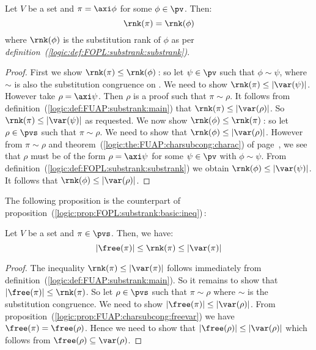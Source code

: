 \begin{prop}\label{logic:prop:FUAP:substrank:recursion:axiom}
Let $V$ be a set and $\pi=\axi\phi$ for some $\phi\in\pv$. Then:
    \[
    \rnk(\pi)=\rnk(\phi)
    \]
where $\rnk(\phi)$ is the substitution rank of $\phi$ as per {\em
definition~(\ref{logic:def:FOPL:substrank:substrank})}.
\end{prop}
\begin{proof}
First we show $\rnk(\pi)\leq\rnk(\phi)$\,: so let $\psi\in\pv$ such
that $\phi\sim\psi$, where $\sim$ is also the substitution
congruence on \pv. We need to show $\rnk(\pi)\leq|\var(\psi)|$.
However take $\rho=\axi\psi$. Then $\rho$ is a proof such that
$\pi\sim\rho$. It follows from
definition~(\ref{logic:def:FUAP:substrank:main}) that
$\rnk(\pi)\leq|\var(\rho)|$. So $\rnk(\pi)\leq|\var(\psi)|$ as
requested. We now show $\rnk(\phi)\leq\rnk(\pi)$\,: so let
$\rho\in\pvs$ such that $\pi\sim\rho$. We need to show that
$\rnk(\phi)\leq|\var(\rho)|$. However from $\pi\sim\rho$ and
theorem~(\ref{logic:the:FUAP:charsubcong:charac}) of
page~\pageref{logic:the:FUAP:charsubcong:charac}, we see that $\rho$
must be of the form $\rho=\axi\psi$ for some $\psi\in\pv$ with
$\phi\sim\psi$. From
definition~(\ref{logic:def:FOPL:substrank:substrank}) we obtain
$\rnk(\phi)\leq|\var(\psi)|$. It follows that
$\rnk(\phi)\leq|\var(\rho)|$.
\end{proof}

The following proposition is the counterpart of
proposition~(\ref{logic:prop:FOPL:substrank:basic:ineq})\,:

\begin{prop}\label{logic:prop:FUAP:substrank:basic:ineq}
Let $V$ be a set and $\pi\in\pvs$. Then, we have:
    \[
    |\free(\pi)|\leq\rnk(\pi)\leq|\var(\pi)|
    \]
\end{prop}
\begin{proof}
The inequality $\rnk(\pi)\leq|\var(\pi)|$ follows immediately from
definition~(\ref{logic:def:FUAP:substrank:main}). So it remains to
show that $|\free(\pi)|\leq\rnk(\pi)$. So let $\rho\in\pvs$ such
that $\pi\sim\rho$ where $\sim$ is the substitution congruence. We
need to show $|\free(\pi)|\leq|\var(\rho)|$. From
proposition~(\ref{logic:prop:FUAP:charsubcong:freevar}) we have
$\free(\pi)=\free(\rho)$. Hence we need to show that
$|\free(\rho)|\leq|\var(\rho)|$ which follows from
$\free(\rho)\subseteq\var(\rho)$.
\end{proof}

